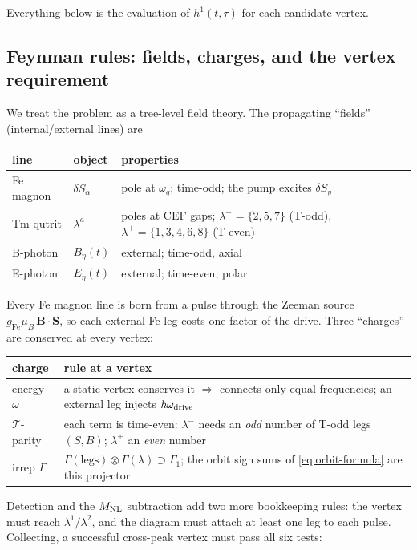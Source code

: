 \documentclass[11pt,a4paper]{article}
\newcommand{\Fe}{\mathrm{Fe}}
\newcommand{\ve}[1]{\boldsymbol{#1}}
\begin{document}
Everything below is the evaluation of $h^1(t,\tau)$ for each candidate vertex.

\subsection{Feynman rules: fields, charges, and the vertex requirement}

We treat the problem as a tree-level field theory.  The propagating ``fields''
(internal/external lines) are
\begin{center}
\renewcommand{\arraystretch}{1.25}
\begin{tabular}{lll}
\toprule
line & object & properties \\
\midrule
Fe magnon & $\delta S_\alpha$ & pole at $\omega_q$; time-odd; the pump excites $\delta S_y$ \\
Tm qutrit & $\lambda^a$ & poles at CEF gaps; $\lambda^-\!=\!\{2,5,7\}$ (T-odd), $\lambda^+\!=\!\{1,3,4,6,8\}$ (T-even) \\
B-photon & $B_\eta(t)$ & external; time-odd, axial \\
E-photon & $E_\eta(t)$ & external; time-even, polar \\
\bottomrule
\end{tabular}
\end{center}
Every Fe magnon line is born from a pulse through the Zeeman source
$g_{\Fe}\mu_B\,\ve B\!\cdot\!\ve S$, so each external Fe leg costs one factor of
the drive.  Three ``charges'' are conserved at every vertex:
\begin{center}
\renewcommand{\arraystretch}{1.3}
\begin{tabular}{ll}
\toprule
charge & rule at a vertex \\
\midrule
energy $\omega$ & a static vertex conserves it $\Rightarrow$ connects only equal frequencies; an external leg injects $\hbar\omega_{\rm drive}$ \\
$\mathcal T$-parity & each term is time-even: $\lambda^-$ needs an \emph{odd} number of T-odd legs $(S,B)$; $\lambda^+$ an \emph{even} number \\
irrep $\Gamma$ & $\Gamma(\text{legs})\otimes\Gamma(\lambda)\supset\Gamma_1$; the orbit sign sums of \eqref{eq:orbit-formula} are this projector \\
\bottomrule
\end{tabular}
\end{center}
Detection and the $M_{\rm NL}$ subtraction add two more bookkeeping rules: the
vertex must reach $\lambda^1/\lambda^2$, and the diagram must attach at least
one leg to each pulse.  Collecting, a successful cross-peak vertex must pass all
six tests:
\end{document}
